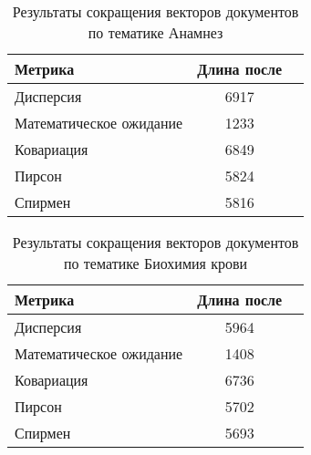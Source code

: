 \begin{table}[H]
    \centering
    \begin{tabular}{|l|c|c|}
    \hline
    \textbf{Метрика}                                  & \textbf{Длина после}             \\ \hline
    Дисперсия                                         & 6917                             \\ \hline
    Математическое ожидание                           & 1233                             \\ \hline
    Ковариация                                        & 6849                             \\ \hline
    Пирсон                                            & 5824                             \\ \hline
    Спирмен                                           & 5816                             \\ \hline
    \end{tabular}
    \caption{Результаты сокращения векторов документов по тематике Анамнез}
    \label{tab:similarity}
\end{table}

\begin{table}[H]
    \centering
    \begin{tabular}{|l|c|c|}
    \hline
    \textbf{Метрика}                                  & \textbf{Длина после}             \\ \hline
    Дисперсия                                         & 5964                             \\ \hline
    Математическое ожидание                           & 1408                             \\ \hline
    Ковариация                                        & 6736                             \\ \hline
    Пирсон                                            & 5702                             \\ \hline
    Спирмен                                           & 5693                             \\ \hline
    \end{tabular}
    \caption{Результаты сокращения векторов документов по тематике Биохимия крови}
    \label{tab:similarity}
\end{table}


